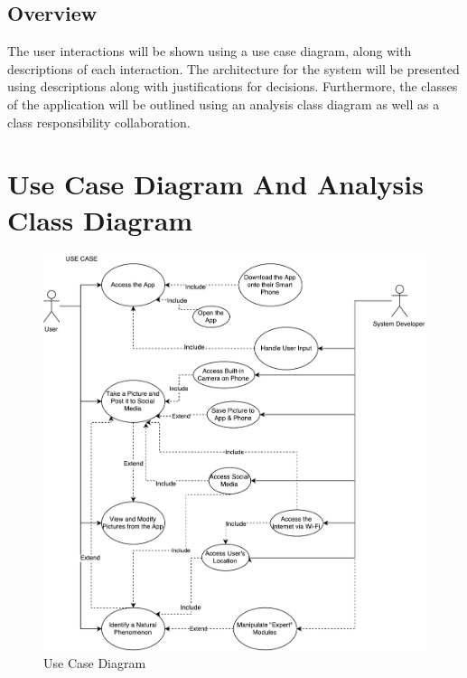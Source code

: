 \documentclass[]{article}
\begin{document}
\subsection{Overview}
\label{sub:overview}
The user interactions will be shown using a use case diagram, along with descriptions of each interaction.  The architecture for the system will be presented using descriptions along with justifications for decisions.  Furthermore, the classes of the application will be outlined using an analysis class diagram as well as a class responsibility collaboration. 


\section{Use Case Diagram And Analysis Class Diagram}
\begin{figure}
	\includegraphics[width=\linewidth]{usecase.pdf}
	\caption{Use Case Diagram}
\end{figure}
\end{document}
